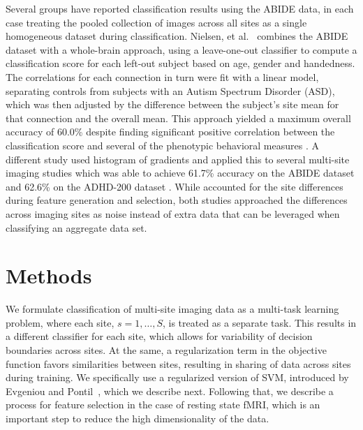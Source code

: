 \documentclass{llncs}
\begin{document}
Several groups have reported classification results using the ABIDE data, in
each case treating the pooled collection of images across all sites as a single
homogeneous dataset during classification. Nielsen, et al.~\cite{Jared} combines
the ABIDE dataset with a whole-brain approach, using a leave-one-out classifier
to compute a classification score for each left-out subject based on age, gender
and handedness. The correlations for each connection in turn were fit with a
linear model, separating controls from subjects with an Autism Spectrum Disorder (ASD), which was then adjusted by the
difference between the subject's site mean for that connection and the overall
mean. This approach yielded a maximum overall accuracy of 60.0\% despite finding
significant positive correlation between the classification score and several of
the phenotypic behavioral measures \cite{Jared}. A different study used
histogram of gradients and applied this to several multi-site imaging studies
which was able to achieve 61.7\% accuracy on the ABIDE dataset and 62.6\% on the
ADHD-200 dataset \cite{ghiassian}. While \cite{Jared} accounted for the site
differences during feature generation and selection, both studies approached the
differences across imaging sites as noise instead of extra data that can be
leveraged when classifying an aggregate data set.



\section{Methods}
We formulate classification of multi-site imaging data as a multi-task learning
problem, where each site, $s = 1, \ldots, S$, is treated as a separate
task. This results in a different classifier for each site, which allows for
variability of decision boundaries across sites. At the same, a regularization
term in the objective function favors similarities between sites, resulting in
sharing of data across sites during training. We specifically use a regularized
version of SVM, introduced by Evgeniou and Pontil~\cite{regMTL}, which we
describe next. Following that, we describe a process for feature selection in
the case of resting state fMRI, which is an important step to reduce the high
dimensionality of the data.
\end{document}
